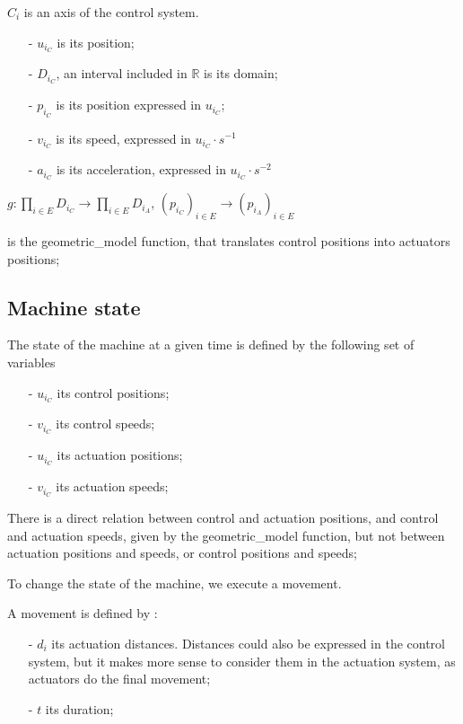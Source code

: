 $C_i$ is an axis of the control system.
\begin{itemize}
    \item[-] $u_{i_C}$ is its position;
    \item[-] $D_{i_C}$, an interval included in $\mathbb{R}$ is its domain;
    \item[-] $p_{i_C}$ is its position expressed in $u_{i_C}$;
    \item[-] $v_{i_C}$ is its speed, expressed in $u_{i_C} \cdot s^{-1}$
    \item[-] $a_{i_C}$ is its acceleration, expressed in $u_{i_C} \cdot s^{-2}$\newline
\end{itemize}

$g :  \prod\limits_{i\in E} D_{i_C} \rightarrow \prod\limits_{i\in E} D_{i_A} $,
$ (p_{i_C})_{i \in E}\rightarrow (p_{i_A})_{i \in E}$\newline

is the geometric_model function, that translates control positions into actuators positions;


\newpage

\subsection{Machine state}

The state of the machine at a given time is defined by the following set of variables

\begin{itemize}
    \item[-] $u_{i_C}$ its control positions;
    \item[-] $v_{i_C}$ its control speeds;
    \item[-] $u_{i_C}$ its actuation positions;
    \item[-] $v_{i_C}$ its actuation speeds;
\end{itemize}

There is a direct relation between control and actuation positions, and control and actuation speeds, given by
the geometric_model function, but not between actuation positions and speeds, or control positions and speeds;\newline

To change the state of the machine, we execute a movement.\newline

A movement is defined by :
\begin{itemize}
    \item[-] $d_i$ its actuation distances. Distances could also be expressed in the control system,
    but it makes more sense to consider them in the actuation system, as actuators do the final
    movement;
    \item[-] $t$ its duration;
\end{itemize}


